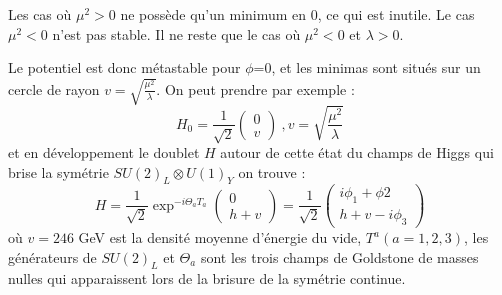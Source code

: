 Les cas où $\mu^{2}>0$ ne possède qu'un minimum en $0$, ce qui est inutile. Le cas $\mu^{2}<0$ n'est pas stable. Il ne reste que le cas où $\mu^{2}<0$ et $\lambda>0$.

\begin{minipagewithmarginpars}[h]{\textwidth}
\centering
{}
\label{pot}
\end{minipagewithmarginpars}
Le potentiel est donc métastable pour $\phi$=0, et les minimas sont situés sur un cercle de rayon $v=\sqrt{\frac{\mu^{2}}{\lambda}}$. On peut prendre par exemple :
\begin{equation}
H_{0}=\frac{1}{\sqrt{2}}\begin{pmatrix} 
0\\
v
\end{pmatrix} \ , v=\sqrt{\frac{\mu^{2}}{\lambda}}
\end{equation}
et en développement le doublet $H$ autour de cette état du champs de Higgs qui brise la symétrie $SU(2)_{L}\otimes U(1)_{Y}$ on trouve : 
\begin{equation}
H=\frac{1}{\sqrt{2}}\exp^{-i\Theta_{a}T_{a}}\begin{pmatrix} 
0\\
h+v
\end{pmatrix}=\frac{1}{\sqrt{2}}\begin{pmatrix} 
i\phi_{1}+\phi{2}\\
h+v-i\phi_{3}
\end{pmatrix}
\end{equation}
où $v=246$ GeV est la densité moyenne d'énergie du vide, $T^{a} (a=1,2,3)$, les générateurs de $SU(2)_{L}$ et $\Theta_{a}$ sont les trois champs de Goldstone de masses nulles qui apparaissent lors de la brisure de la symétrie continue.

